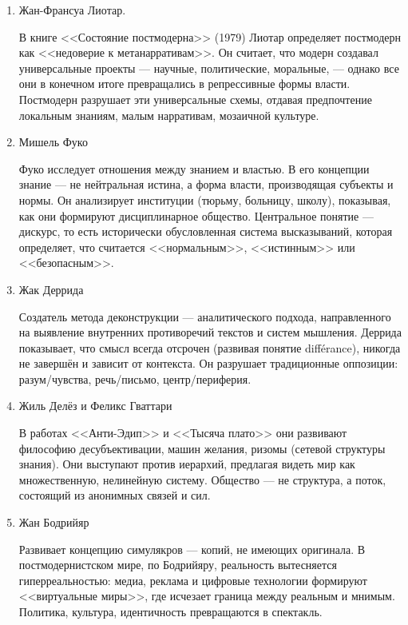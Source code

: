 \documentclass[12pt,a4paper]{article}
\begin{document}
	\begin{enumerate}
		\item Жан-Франсуа Лиотар.
		
		В книге <<Состояние постмодерна>> (1979) Лиотар определяет постмодерн как <<недоверие к метанарративам>>. Он считает, что модерн создавал универсальные проекты — научные, политические, моральные, — однако все они в конечном итоге превращались в репрессивные формы власти. Постмодерн разрушает эти универсальные схемы, отдавая предпочтение локальным знаниям, малым нарративам, мозаичной культуре.
		
		\item Мишель Фуко
		
		Фуко исследует отношения между знанием и властью. В его концепции знание — не нейтральная истина, а форма власти, производящая субъекты и нормы. Он анализирует институции (тюрьму, больницу, школу), показывая, как они формируют дисциплинарное общество. Центральное понятие — дискурс, то есть исторически обусловленная система высказываний, которая определяет, что считается <<нормальным>>, <<истинным>> или <<безопасным>>.
		
		\item Жак Деррида
		
		Создатель метода деконструкции — аналитического подхода, направленного на выявление внутренних противоречий текстов и систем мышления. Деррида показывает, что смысл всегда отсрочен (развивая понятие différance), никогда не завершён и зависит от контекста. Он разрушает традиционные оппозиции: разум/чувства, речь/письмо, центр/периферия.
		
		\item Жиль Делёз и Феликс Гваттари
		
		В работах <<Анти-Эдип>> и <<Тысяча плато>> они развивают философию десубъективации, машин желания, ризомы (сетевой структуры знания). Они выступают против иерархий, предлагая видеть мир как множественную, нелинейную систему. Общество — не структура, а поток, состоящий из анонимных связей и сил.
		
		\item Жан Бодрийяр
		
		Развивает концепцию симулякров — копий, не имеющих оригинала. В постмодернистском мире, по Бодрийяру, реальность вытесняется гиперреальностью: медиа, реклама и цифровые технологии формируют <<виртуальные миры>>, где исчезает граница между реальным и мнимым. Политика, культура, идентичность превращаются в спектакль.
	\end{enumerate}
	
\end{document}
